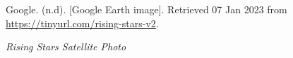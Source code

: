 \begin{figure}[hbtp]
  \caption[Rising Stars Satellite Photo]{\textit{Rising Stars Satellite Photo}}%
  \label{fig:rising-stars-sat-photo}
  {Google. (n.d). [Google Earth image]. Retrieved 07 Jan 2023 from \url{https://tinyurl.com/rising-stars-v2}.}
\end{figure}


